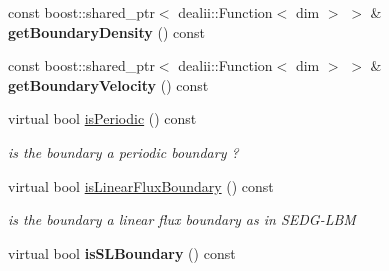 \begin{DoxyCompactItemize}
\item 
\hypertarget{classnatrium_1_1LinearFluxBoundary_a6e1ab8aa7ece5c165e36363e81c5b521}{
const boost::shared\_\-ptr$<$ dealii::Function$<$ dim $>$ $>$ \& {\bfseries getBoundaryDensity} () const }
\label{classnatrium_1_1LinearFluxBoundary_a6e1ab8aa7ece5c165e36363e81c5b521}

\item 
\hypertarget{classnatrium_1_1LinearFluxBoundary_ab631d4d94882bb2a29002498d2ddb34c}{
const boost::shared\_\-ptr$<$ dealii::Function$<$ dim $>$ $>$ \& {\bfseries getBoundaryVelocity} () const }
\label{classnatrium_1_1LinearFluxBoundary_ab631d4d94882bb2a29002498d2ddb34c}

\item 
\hypertarget{classnatrium_1_1LinearFluxBoundary_a5a7b89b4c2aadc88c8f6374b8877ad4f}{
virtual bool \hyperlink{classnatrium_1_1LinearFluxBoundary_a5a7b89b4c2aadc88c8f6374b8877ad4f}{isPeriodic} () const }
\label{classnatrium_1_1LinearFluxBoundary_a5a7b89b4c2aadc88c8f6374b8877ad4f}

\begin{DoxyCompactList}\small\item\em is the boundary a periodic boundary ? \item\end{DoxyCompactList}\item 
\hypertarget{classnatrium_1_1LinearFluxBoundary_acb35b886c5d0777d185eb1eb38f44e09}{
virtual bool \hyperlink{classnatrium_1_1LinearFluxBoundary_acb35b886c5d0777d185eb1eb38f44e09}{isLinearFluxBoundary} () const }
\label{classnatrium_1_1LinearFluxBoundary_acb35b886c5d0777d185eb1eb38f44e09}

\begin{DoxyCompactList}\small\item\em is the boundary a linear flux boundary as in SEDG-\/LBM \item\end{DoxyCompactList}\item 
\hypertarget{classnatrium_1_1LinearFluxBoundary_a24be4f9709268e4753b895cf930aecec}{
virtual bool {\bfseries isSLBoundary} () const }
\label{classnatrium_1_1LinearFluxBoundary_a24be4f9709268e4753b895cf930aecec}

\end{DoxyCompactItemize}
